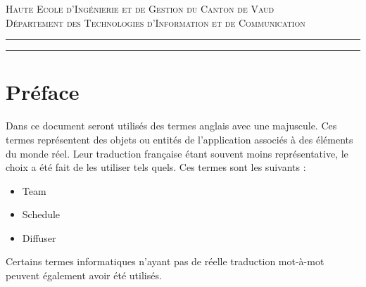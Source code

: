 \documentclass[french]{article}
\begin{document}
\begin{titlepage}
	\vfill %
	
	
	\textsc{\LARGE Haute Ecole d'Ingénierie et de Gestion du Canton de Vaud}\\[1.5cm] %
	\textsc{\large Département des Technologies d'Information et de Communication}\\[0.5cm] %

	
	\vspace{0.1\textheight} %
	
	
	\rule{\textwidth}{0.4pt} %
	
	\vspace{2pt}\vspace{-\baselineskip} %
	
	\rule{\textwidth}{1pt} %
	
\end{titlepage}

\maketitle

\tableofcontents
\newpage
\listoffigures
\newpage
\lstlistoflistings

\newpage

\section{Préface}

Dans ce document seront utilisés des termes anglais avec une majuscule. Ces termes représentent des objets ou entités de l'application associés à des éléments du monde réel. Leur traduction française étant souvent moins représentative, le choix a été fait de les utiliser tels quels. Ces termes sont les suivants :
\begin{itemize}
	\item Team
	\item Schedule
	\item Diffuser
\end{itemize}
Certains termes informatiques n'ayant pas de réelle traduction mot-à-mot peuvent également avoir été utilisés.
\end{document}
